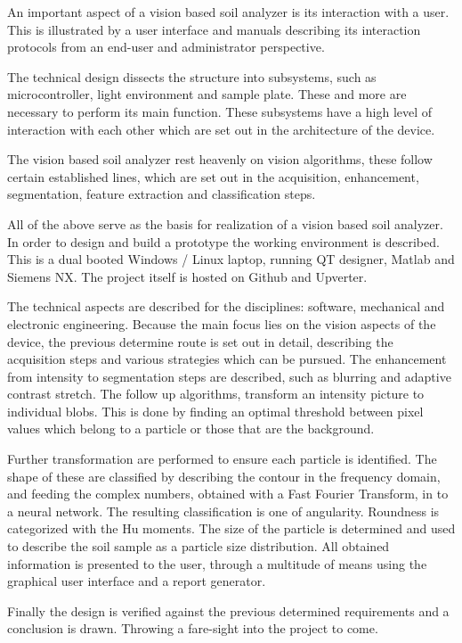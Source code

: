 \documentclass[11pt,fleqn,,a4paper,twoside,openright]{book}
\begin{document}
An important aspect of a vision based soil analyzer is its interaction with a user. This is illustrated by a user interface and manuals describing its interaction protocols from an end-user and administrator perspective.

The technical design dissects the structure into subsystems, such as microcontroller, light environment and sample plate. These and more are necessary to perform its main function. These subsystems have a high level of interaction with each other which are set out in the architecture of the device. 

The vision based soil analyzer rest heavenly on vision algorithms, these follow certain established lines, which are set out in the acquisition, enhancement, segmentation, feature extraction and classification steps.

All of the above serve as the basis for realization of a vision based soil analyzer. In order to design and build a prototype the working environment is described. This is a dual booted Windows / Linux laptop, running QT designer, Matlab and Siemens NX. The project itself is hosted on Github and Upverter.

The technical aspects are described for the disciplines: software, mechanical and electronic engineering. Because the main focus lies on the vision aspects of the device, the previous determine route is set out in detail, describing the acquisition steps and various strategies which can be pursued. The enhancement from intensity to segmentation steps are described, such as blurring and adaptive contrast stretch. The follow up algorithms, transform an intensity picture to individual blobs. This is done by finding an optimal threshold between pixel values which belong to a particle or those that are the background. 

Further transformation are performed to ensure each particle is identified. The shape of these are classified by describing the contour in the frequency domain, and feeding the complex numbers, obtained with a Fast Fourier Transform, in to a neural network. The resulting classification is one of angularity. Roundness is categorized with the Hu moments. The size of the particle is determined and used to describe the soil sample as a particle size distribution. All obtained information is presented to the user, through a multitude of means using the graphical user interface and a report generator. 

Finally the design is verified against the previous determined requirements and a conclusion is drawn. Throwing a fare-sight into the project to come.
\end{document}
